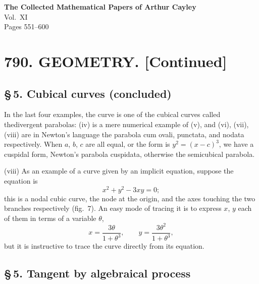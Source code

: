 \documentclass[11pt,a4paper]{article}
\theoremstyle{definition}
\begin{document}
\begin{center}
{\Large\bfseries The Collected Mathematical Papers of Arthur Cayley}\\[6pt]
{\large Vol.~XI}\\[12pt]
{\large Pages 551--600}\\[24pt]
\end{center}

\tableofcontents
\newpage

\section*{790. GEOMETRY. [Continued]}

\subsection*{\S\,5. Cubical curves (concluded)}

In the last four examples, the curve is one of the cubical curves called the\break divergent parabolas: (iv) is a mere numerical example of (v), and (vi), (vii), (viii) are in Newton's language the parabola cum ovali, punctata, and nodata respectively. When $a$, $b$, $c$ are all equal, or the form is $y^2=(x-c)^3$, we have a cuspidal form, Newton's parabola cuspidata, otherwise the semicubical parabola.

(viii) As an example of a curve given by an implicit equation, suppose the equation is
\[
x^2 + y^2 - 3xy = 0;
\]
this is a nodal cubic curve, the node at the origin, and the axes touching the two branches respectively (fig.~7). An easy mode of tracing it is to express $x$, $y$ each of them in terms of a variable $\theta$,
\[
x = \frac{3\theta}{1+\theta^3},\qquad y = \frac{3\theta^2}{1+\theta^3},
\]
but it is instructive to trace the curve directly from its equation.

\subsection*{\S\,5. Tangent by algebraical process}
\end{document}
